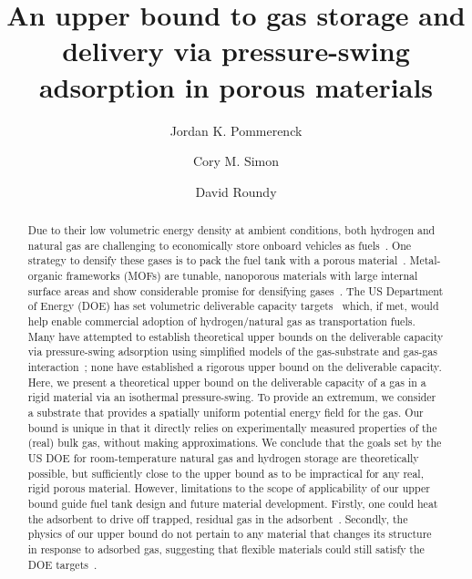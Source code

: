 \documentclass[letterpaper,twocolumn,amsmath,amssymb,nature]{revtex4-2}
\begin{document}
\title{
An upper bound to gas storage and delivery via pressure-swing adsorption in
porous materials}

\author{Jordan K. Pommerenck}
\author{Cory M. Simon}
\author{David Roundy}

\begin{linenomath}
\begin{abstract}
Due to their low volumetric energy density at ambient conditions, both hydrogen
and natural gas are challenging to economically store onboard vehicles as
fuels~\cite{mason2014evaluating, sircar2002pressure}. One strategy to densify
these gases is to pack the fuel tank with a porous
material~\cite{schoedel2016role}. Metal-organic frameworks (MOFs) are tunable,
nanoporous materials with large internal surface areas and show considerable
promise for densifying gases~\cite{makal2012methane,mason2014evaluating,
suh2011hydrogen,garcia2018benchmark, schoedel2016role}. The US Department of
Energy (DOE) has set volumetric deliverable capacity
targets~\cite{simon2015materials, h2targetsDOE} which, if met, would help
enable commercial adoption of hydrogen/natural gas as transportation fuels.
Many have attempted to establish theoretical upper bounds on the deliverable
capacity via pressure-swing adsorption using simplified models of the
gas-substrate and gas-gas interaction~\cite{gomez2014exploring,
gomez2017impact, kaija2018high, lee2019predicting}; none have established a
rigorous upper bound on the deliverable capacity. Here, we present a
theoretical upper bound on the deliverable capacity of a gas in a rigid
material via an isothermal pressure-swing. To provide an extremum, we consider
a substrate that provides a spatially uniform potential energy field for the
gas. Our bound is unique in that it directly relies on experimentally measured
properties of the (real) bulk gas, without making approximations. We conclude
that the goals set by the US DOE for room-temperature natural gas and hydrogen
storage are theoretically possible, but sufficiently close to the upper bound
as to be impractical for any real, rigid porous material. However, limitations
to the scope of applicability of our upper bound guide fuel tank design and
future material development. Firstly, one could heat the adsorbent to drive off
trapped, residual gas in the adsorbent~\cite{gomez2014exploring}. Secondly, the
physics of our upper bound do not pertain to any material that changes its
structure in response to adsorbed gas, suggesting that flexible materials could
still satisfy the DOE targets~\cite{schneemann2014flexible, choi2008broadly,
mason2015methane}.
  
\end{abstract}
\end{linenomath}
\end{document}
